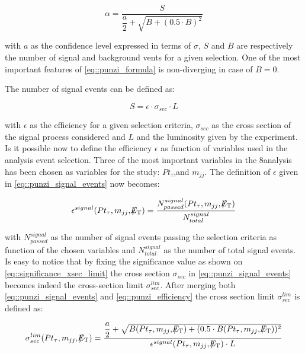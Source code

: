 \begin{equation}
\alpha = \dfrac{S}{\dfrac{a}{2} + \sqrt{B + (0.5 \cdot B)^{2}}}
\label{eq::punzi_formula}
\end{equation}

with $a$ as the confidence level expressed in terms of $\sigma$, $S$ and $B$ are respectively the number of signal and background vents for a given selection. One of the most important features of \autoref{eq::punzi_formula} is non-diverging in case of $B = 0$.

The number of signal events can be defined as:

\begin{equation}
S = \epsilon \cdot \sigma_{sec} \cdot L
\label{eq::punzi_signal_events}
\end{equation}

with $\epsilon$ as the efficiency for a given selection criteria, $\sigma_{sec}$ as the cross section of the signal process considered and $L$ and the luminosity given by the experiment. Is it possible now to define the efficiency $\epsilon$ as function of variables used in the analysis event selection. Three of the most important variables in the 8\tev analysis has been chosen as variables for the study: $Pt_{\tau}$,\met and $m_{jj}$. The definition of $\epsilon$ given in \autoref{eq::punzi_signal_events} now becomes:

\begin{equation}
\epsilon^{signal} ( Pt_{\tau} , m_{jj} ,  \slash\mkern-12mu{E}_{\text{T}} ) = \dfrac{N^{signal}_{passed}(Pt_{\tau} , m_{jj} ,  \slash\mkern-12mu{E}_{\text{T}})}{N^{signal}_{total}}
\label{eq::punzi_efficiency}
\end{equation}

with $N^{signal}_{passed}$ as the number of signal events passing the selection criteria as function of the chosen variables and $N^{signal}_{total}$ as the number of total signal events. Is easy to notice that by fixing the significance value as shown on \autoref{eq::significance_xsec_limit} the cross section $\sigma_{sec}$ in \autoref{eq::punzi_signal_events} becomes indeed the cross-section limit $\sigma^{lim}_{sec}$. After merging both \autoref{eq::punzi_signal_events} and \autoref{eq::punzi_efficiency} the cross section limit $\sigma^{lim}_{sec}$ is defined as:
	
\begin{equation}
\sigma^{lim}_{sec}( Pt_{\tau} , m_{jj} ,  \met ) = \dfrac{\dfrac{a}{2} + \sqrt{B( Pt_{\tau} , m_{jj} ,  \met ) + (0.5 \cdot B( Pt_{\tau} , m_{jj} ,  \met ))^{2}}}{\epsilon^{signal} ( Pt_{\tau} , m_{jj} ,  \met ) \cdot L}
\label{eq::xsec_lim}
\end{equation}

